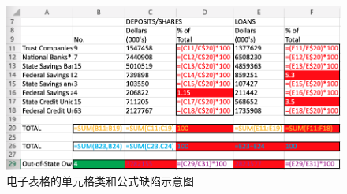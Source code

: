 \begin{figure}[tp]    
    \centering
    \includegraphics[width=1\textwidth]{figure/figure-3-3.png}
    \caption{电子表格的单元格类和公式缺陷示意图}
    \label{figure-3-3}
\end{figure}